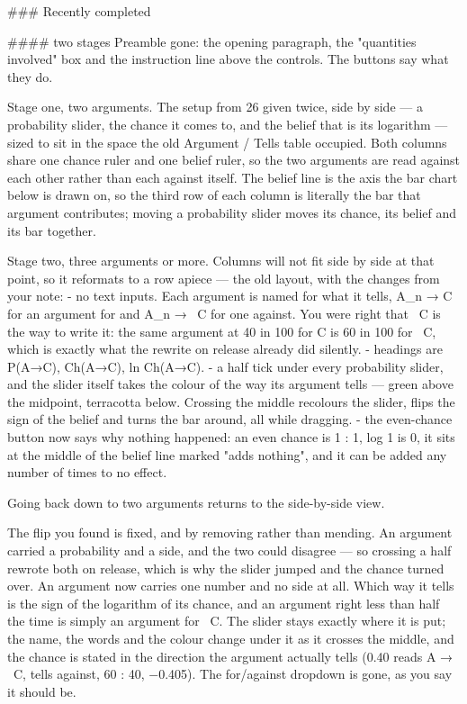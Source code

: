 ### Recently completed

#### two stages
Preamble gone: the opening paragraph, the "quantities involved" box and the
instruction line above the controls. The buttons say what they do.

Stage one, two arguments. The setup from 26 given twice, side by side — a
probability slider, the chance it comes to, and the belief that is its
logarithm — sized to sit in the space the old Argument / Tells table occupied.
Both columns share one chance ruler and one belief ruler, so the two arguments
are read against each other rather than each against itself. The belief line is
the axis the bar chart below is drawn on, so the third row of each column is
literally the bar that argument contributes; moving a probability slider moves
its chance, its belief and its bar together.

Stage two, three arguments or more. Columns will not fit side by side at that
point, so it reformats to a row apiece — the old layout, with the changes from
your note:
 - no text inputs. Each argument is named for what it tells, A_n → C for an
   argument for and A_n → ~C for one against. You were right that ~C is the
   way to write it: the same argument at 40 in 100 for C is 60 in 100 for ~C,
   which is exactly what the rewrite on release already did silently.
 - headings are P(A→C), Ch(A→C), ln Ch(A→C).
 - a half tick under every probability slider, and the slider itself takes the
   colour of the way its argument tells — green above the midpoint, terracotta
   below. Crossing the middle recolours the slider, flips the sign of the
   belief and turns the bar around, all while dragging.
 - the even-chance button now says why nothing happened: an even chance is
   1 : 1, log 1 is 0, it sits at the middle of the belief line marked "adds
   nothing", and it can be added any number of times to no effect.

Going back down to two arguments returns to the side-by-side view.

The flip you found is fixed, and by removing rather than mending. An argument
carried a probability and a side, and the two could disagree — so crossing a
half rewrote both on release, which is why the slider jumped and the chance
turned over. An argument now carries one number and no side at all. Which way it
tells is the sign of the logarithm of its chance, and an argument right less
than half the time is simply an argument for ~C. The slider stays exactly where
it is put; the name, the words and the colour change under it as it crosses the
middle, and the chance is stated in the direction the argument actually tells
(0.40 reads A → ~C, tells against, 60 : 40, −0.405). The for/against dropdown is
gone, as you say it should be.

